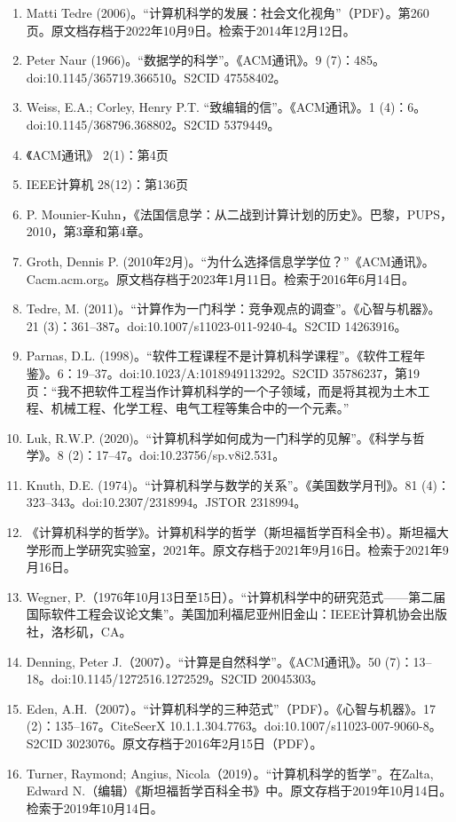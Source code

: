 \begin{enumerate}
\item Matti Tedre (2006)。“计算机科学的发展：社会文化视角”（PDF）。第260页。原文档存档于2022年10月9日。检索于2014年12月12日。  
\item Peter Naur (1966)。“数据学的科学”。《ACM通讯》。9 (7)：485。doi:10.1145/365719.366510。S2CID 47558402。  
\item Weiss, E.A.; Corley, Henry P.T. “致编辑的信”。《ACM通讯》。1 (4)：6。doi:10.1145/368796.368802。S2CID 5379449。  
\item 《ACM通讯》 2(1)：第4页  
\item IEEE计算机 28(12)：第136页  
\item P. Mounier-Kuhn，《法国信息学：从二战到计算计划的历史》。巴黎，PUPS，2010，第3章和第4章。  
\item Groth, Dennis P. (2010年2月)。“为什么选择信息学学位？”《ACM通讯》。Cacm.acm.org。原文档存档于2023年1月11日。检索于2016年6月14日。  
\item Tedre, M. (2011)。“计算作为一门科学：竞争观点的调查”。《心智与机器》。21 (3)：361–387。doi:10.1007/s11023-011-9240-4。S2CID 14263916。  
\item Parnas, D.L. (1998)。“软件工程课程不是计算机科学课程”。《软件工程年鉴》。6：19–37。doi:10.1023/A:1018949113292。S2CID 35786237，第19页：“我不把软件工程当作计算机科学的一个子领域，而是将其视为土木工程、机械工程、化学工程、电气工程等集合中的一个元素。”  
\item Luk, R.W.P. (2020)。“计算机科学如何成为一门科学的见解”。《科学与哲学》。8 (2)：17–47。doi:10.23756/sp.v8i2.531。  
\item Knuth, D.E. (1974)。“计算机科学与数学的关系”。《美国数学月刊》。81 (4)：323–343。doi:10.2307/2318994。JSTOR 2318994。
\item 《计算机科学的哲学》。计算机科学的哲学（斯坦福哲学百科全书）。斯坦福大学形而上学研究实验室，2021年。原文存档于2021年9月16日。检索于2021年9月16日。  
\item Wegner, P.（1976年10月13日至15日）。“计算机科学中的研究范式——第二届国际软件工程会议论文集”。美国加利福尼亚州旧金山：IEEE计算机协会出版社，洛杉矶，CA。  
\item Denning, Peter J.（2007）。“计算是自然科学”。《ACM通讯》。50 (7)：13–18。doi:10.1145/1272516.1272529。S2CID 20045303。  
\item Eden, A.H.（2007）。“计算机科学的三种范式”（PDF）。《心智与机器》。17 (2)：135–167。CiteSeerX 10.1.1.304.7763。doi:10.1007/s11023-007-9060-8。S2CID 3023076。原文存档于2016年2月15日（PDF）。  
\item Turner, Raymond; Angius, Nicola（2019）。“计算机科学的哲学”。在Zalta, Edward N.（编辑）《斯坦福哲学百科全书》中。原文存档于2019年10月14日。检索于2019年10月14日。  

\end{enumerate}
